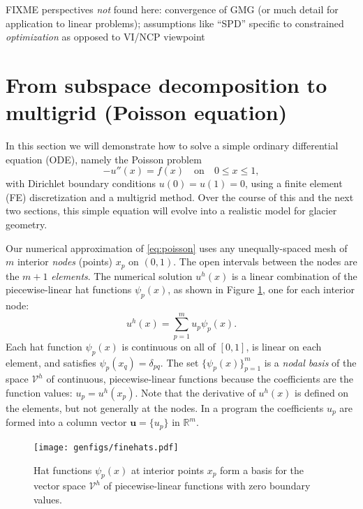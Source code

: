 \documentclass[letterpaper,final,12pt,reqno]{amsart}
\newcommand{\RR}{\mathbb{R}}
\newcommand{\bu}{\mathbf{u}}
\begin{document}
FIXME perspectives \emph{not} found here: convergence of GMG (or much detail for application to linear problems); assumptions like ``SPD'' specific to constrained \emph{optimization} as opposed to VI/NCP viewpoint


\section{From subspace decomposition to multigrid (Poisson equation)} \label{sec:subspace}

In this section we will demonstrate how to solve a simple ordinary differential equation (ODE), namely the Poisson problem
\begin{equation}
- u''(x) = f(x) \quad \text{on} \quad 0 \le x \le 1, \label{eq:poisson}
\end{equation}
with Dirichlet boundary conditions $u(0)=u(1)=0$, using a finite element (FE) discretization and a multigrid method.  Over the course of this and the next two sections, this simple equation will evolve into a realistic model for glacier geometry.

Our numerical approximation of \eqref{eq:poisson} uses any unequally-spaced mesh of $m$ interior \emph{nodes} (points) $x_p$ on $(0,1)$.  The open intervals between the nodes are the $m+1$ \emph{elements}.  The numerical solution $u^h(x)$ is a linear combination of the piecewise-linear hat functions $\psi_p(x)$, as shown in Figure \ref{fig:finehats}, one for each interior node:
\begin{equation}
u^h(x) = \sum_{p=1}^m u_p \psi_p(x). \label{eq:trialsolution}
\end{equation}
Each hat function $\psi_p(x)$ is continuous on all of $[0,1]$, is linear on each element, and satisfies $\psi_p(x_q) = \delta_{pq}$.  The set $\{\psi_p(x)\}_{p=1}^m$ is a \emph{nodal basis} of the space $\mathcal{V}^h$ of continuous, piecewise-linear functions because the coefficients are the function values: $u_p=u^h(x_p)$.  Note that the derivative of $u^h(x)$ is defined on the elements, but not generally at the nodes.  In a program the coefficients $u_p$ are formed into a column vector $\bu=\{u_p\}$ in $\RR^m$.

\begin{figure}
\texttt{[image: genfigs/finehats.pdf]}
\caption{Hat functions $\psi_p(x)$ at interior points $x_p$ form a basis for the vector space $\mathcal{V}^h$ of piecewise-linear functions  with zero boundary values.}
\label{fig:finehats}
\end{figure}
\end{document}
